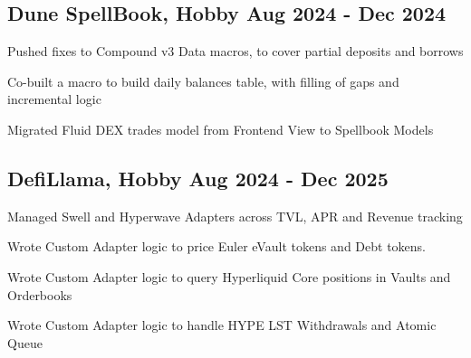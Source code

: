 

\subsection*{ {\color{UI_blue} Dune SpellBook}, {\normalsize\normalfont Hobby} \hfill Aug 2024 - Dec 2024} 
    \begin{zitemize}
        \item Pushed fixes to Compound v3 Data macros, to cover partial deposits and borrows
        \item Co-built a macro to build daily balances table, with filling of gaps and incremental logic
        \item Migrated Fluid DEX trades model from Frontend View to Spellbook Models
    \end{zitemize}

\subsection*{ {\color{UI_blue} DefiLlama}, {\normalsize\normalfont Hobby} \hfill Aug 2024 - Dec 2025} 
    \begin{zitemize}
        \item Managed Swell and Hyperwave Adapters across TVL, APR and Revenue tracking
        \item Wrote Custom Adapter logic to price Euler eVault tokens and Debt tokens.
        \item Wrote Custom Adapter logic to query Hyperliquid Core positions in Vaults and Orderbooks
        \item Wrote Custom Adapter logic to handle HYPE LST Withdrawals and Atomic Queue
    \end{zitemize}
        
